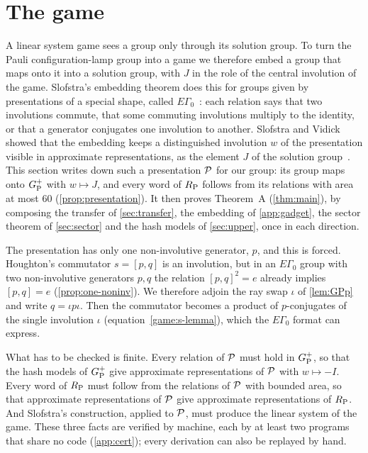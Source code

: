 \section{The game}\label{sec:game}

A linear system game sees a group only through its solution group. To turn the Pauli configuration-lamp group into a game we therefore
embed a group that maps onto it into a solution group, with $J$ in the role of the central involution of the game. Slofstra's embedding
theorem does this for groups given by presentations of a special shape, called $E\Gamma_0$~\cite[\S4]{Slo19}: each relation says that two
involutions commute, that some commuting involutions multiply to the identity, or that a generator conjugates one involution to another.
Slofstra and Vidick showed that the embedding keeps a distinguished involution $w$ of the presentation visible in approximate
representations, as the element $J$ of the solution group~\cite[\S6]{SV18}. This section writes down such a presentation $\mathcal P$ for our
group: its group maps onto $G_{\mathrm P}^{+}$ with $w\mapsto J$, and every word of $R_{\mathrm P}$ follows from its relations with area at most $60$
(\cref{prop:presentation}). It then proves Theorem~A (\cref{thm:main}), by composing the transfer of \cref{sec:transfer}, the embedding of
\cref{app:gadget}, the sector theorem of \cref{sec:sector} and the hash models of \cref{sec:upper}, once in each direction.

The presentation has only one non-involutive generator, $p$, and this is forced. Houghton's commutator $s=[p,q]$ is an involution, but
in an $E\Gamma_0$ group with two non-involutive generators $p,q$ the relation $[p,q]^2=e$ already implies $[p,q]=e$
(\cref{prop:one-noninv}). We therefore adjoin the ray swap $\iota$ of \cref{lem:GPp} and write $q=\iota p\iota$. Then the commutator
becomes a product of $p$-conjugates of the single involution $\iota$ (equation~\eqref{game:s-lemma}), which the $E\Gamma_0$ format can
express.

What has to be checked is finite. Every relation of $\mathcal P$ must hold in $G_{\mathrm P}^{+}$, so that the hash models of $G_{\mathrm P}^{+}$ give approximate
representations of $\mathcal P$ with $w\mapsto-I$. Every word of $R_{\mathrm P}$ must follow from the relations of $\mathcal P$ with bounded area, so that
approximate representations of $\mathcal P$ give approximate representations of $R_{\mathrm P}$. And Slofstra's construction, applied to $\mathcal P$, must
produce the linear system of the game. These three facts are verified by machine, each by at least two programs that share no code
(\cref{app:cert}); every derivation can also be replayed by hand.

